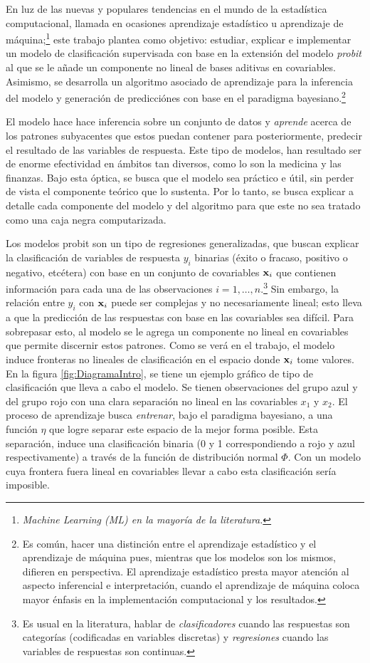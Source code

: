 \documentclass[../Main/Main.tex]{subfiles}
\begin{document}
En luz de las nuevas y populares tendencias en el mundo de la estadística computacional, llamada en ocasiones aprendizaje estadístico u aprendizaje de máquina;\footnote{\textit{Machine Learning (ML) en la mayoría de la literatura.}} este trabajo plantea como objetivo: estudiar, explicar e implementar un modelo de clasificación supervisada con base en la extensión del modelo \textit{probit} al que se le añade un componente no lineal de bases aditivas en covariables. Asimismo, se desarrolla un algoritmo asociado de aprendizaje para la inferencia del modelo y generación de predicciónes con base en el paradigma bayesiano.\footnote{Es común, hacer una distinción entre el aprendizaje estadístico y el aprendizaje de máquina pues, mientras que los modelos son los mismos, difieren en perspectiva. El aprendizaje estadístico presta mayor atención al aspecto inferencial e interpretación, cuando el aprendizaje de máquina coloca mayor énfasis en la implementación computacional y los resultados.}

El modelo hace hace inferencia sobre un conjunto de datos y \textit{aprende} acerca de los patrones subyacentes que estos puedan contener para posteriormente, predecir el resultado de las variables de respuesta. Este tipo de modelos, han resultado ser de enorme efectividad en ámbitos tan diversos, como lo son la medicina y las finanzas. Bajo esta óptica, se busca que el modelo sea práctico e útil, sin perder de vista el componente teórico que lo sustenta. Por lo tanto, se busca explicar a detalle cada componente del modelo y del algoritmo para que este no sea tratado como una caja negra computarizada.

Los modelos probit son un tipo de regresiones generalizadas, que buscan explicar la clasificación de variables de respuesta $y_i$ binarias (éxito o fracaso, positivo o negativo, etcétera) con base en un conjunto de covariables $\mathbf{x}_i$ que contienen información para cada una de las observaciones $i = 1,\ldots,n$.\footnote{Es usual en la literatura, hablar de \textit{clasificadores} cuando las respuestas son categorías (codificadas en variables discretas) y \textit{regresiones} cuando las variables de respuestas son continuas.} Sin embargo, la relación entre $y_i$ con $\mathbf{x}_i$ puede ser complejas y no necesariamente lineal; esto lleva a que la predicción de las respuestas con base en las covariables sea difícil. Para sobrepasar esto, al modelo se le agrega un componente no lineal en covariables que permite discernir estos patrones. Como se verá en el trabajo, el modelo induce fronteras no lineales de clasificación en el espacio donde $\mathbf{x}_i$ tome valores. En la figura \ref{fig:DiagramaIntro}, se tiene un ejemplo gráfico de tipo de clasificación que lleva a cabo el modelo. Se tienen observaciones del grupo azul y del grupo rojo con una clara separación no lineal en las covariables $x_1$ y $x_2$. El proceso de aprendizaje busca \textit{entrenar}, bajo el paradigma bayesiano, a una función $\eta$ que logre separar este espacio de la mejor forma posible. Esta separación, induce una clasificación binaria (0 y 1 correspondiendo a rojo y azul respectivamente) a través de la función de distribución normal $\Phi$. Con un modelo cuya frontera fuera lineal en covariables llevar a cabo esta clasificación sería imposible. 
\end{document}
